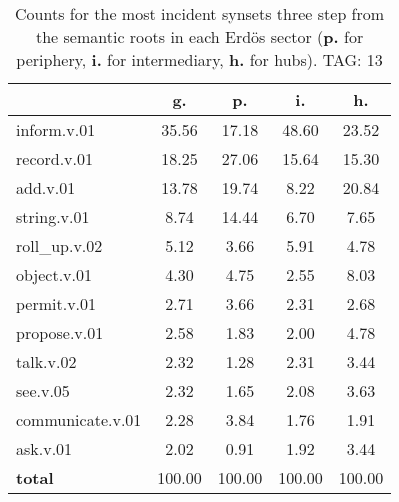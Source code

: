 \begin{table}[h!]
\begin{center}
\begin{tabular}{| l || c | c | c | c |}\hline
 & {\bf g.} & {\bf p.} & {\bf i.} & {\bf h.} \\\hline\hline
inform.v.01 & 35.56  & 17.18  & 48.60  & 23.52 \\\hline
record.v.01 & 18.25  & 27.06  & 15.64  & 15.30 \\\hline
add.v.01 & 13.78  & 19.74  & 8.22  & 20.84 \\\hline
string.v.01 & 8.74  & 14.44  & 6.70  & 7.65 \\\hline
roll\_up.v.02 & 5.12  & 3.66  & 5.91  & 4.78 \\\hline
object.v.01 & 4.30  & 4.75  & 2.55  & 8.03 \\\hline
permit.v.01 & 2.71  & 3.66  & 2.31  & 2.68 \\\hline
propose.v.01 & 2.58  & 1.83  & 2.00  & 4.78 \\\hline
talk.v.02 & 2.32  & 1.28  & 2.31  & 3.44 \\\hline
see.v.05 & 2.32  & 1.65  & 2.08  & 3.63 \\\hline
communicate.v.01 & 2.28  & 3.84  & 1.76  & 1.91 \\\hline
ask.v.01 & 2.02  & 0.91  & 1.92  & 3.44 \\\hline\hline
{{\bf total}} & 100.00  & 100.00  & 100.00  & 100.00 \\\hline
\end{tabular}
\caption{Counts for the most incident synsets three step from the semantic roots in each Erd\"os sector ({\bf p.} for periphery, {\bf i.} for intermediary, {\bf h.} for hubs). TAG: 13}
\end{center}
\end{table}